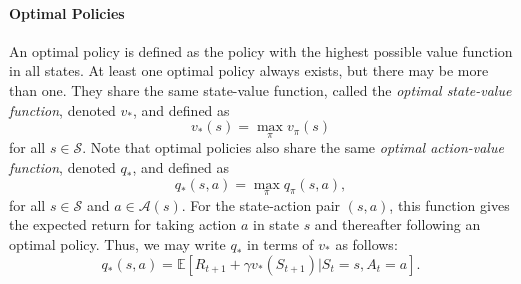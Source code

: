 \documentclass[12pt]{article}
\begin{document}
\paragraph{Optimal Policies}
An optimal policy is defined as the policy with the highest possible value function in all states. At least one optimal policy always exists, but there may be more than one.
They share the same state-value function, called the \emph{optimal state-value function}, denoted $v_*$, and defined as
\[
  v_*(s) = \max_\pi v_\pi(s)
\]
for all $s \in \mathcal S$. Note that optimal policies also share the same \emph{optimal action-value function}, denoted $q_*$, and defined as
\[
  q_*(s,a) = \max_\pi q_\pi(s,a),
\]
for all $s \in \mathcal S$ and $a \in \mathcal A(s)$. For the state-action pair $(s,a)$, this function gives the expected return for taking action $a$ in state $s$ and thereafter following an optimal policy. Thus, we may write $q_*$ in terms of $v_*$ as follows:
\[
  q_*(s,a) = \mathbb E \left[ R_{t+1} + \gamma v_*(S_{t+1}) | S_t = s, A_t = a \right].
\]
\end{document}
